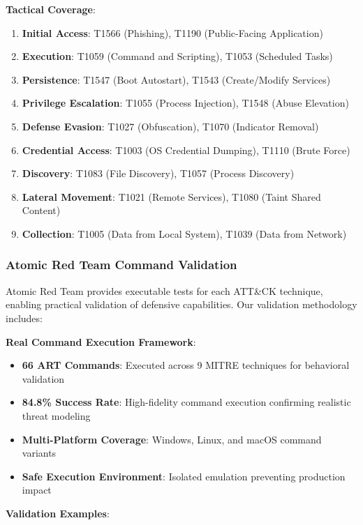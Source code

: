 \documentclass[12pt]{article}
\theoremstyle{definition}
\theoremstyle{plain}
\begin{document}
\textbf{Tactical Coverage}:
\begin{enumerate}
    \item \textbf{Initial Access}: T1566 (Phishing), T1190 (Public-Facing Application)
    \item \textbf{Execution}: T1059 (Command and Scripting), T1053 (Scheduled Tasks)
    \item \textbf{Persistence}: T1547 (Boot Autostart), T1543 (Create/Modify Services)
    \item \textbf{Privilege Escalation}: T1055 (Process Injection), T1548 (Abuse Elevation)
    \item \textbf{Defense Evasion}: T1027 (Obfuscation), T1070 (Indicator Removal)
    \item \textbf{Credential Access}: T1003 (OS Credential Dumping), T1110 (Brute Force)
    \item \textbf{Discovery}: T1083 (File Discovery), T1057 (Process Discovery)
    \item \textbf{Lateral Movement}: T1021 (Remote Services), T1080 (Taint Shared Content)
    \item \textbf{Collection}: T1005 (Data from Local System), T1039 (Data from Network)
\end{enumerate}

\subsubsection{Atomic Red Team Command Validation}

Atomic Red Team provides executable tests for each ATT\&CK technique, enabling practical validation of defensive capabilities. Our validation methodology includes:

\textbf{Real Command Execution Framework}:
\begin{itemize}
    \item \textbf{66 ART Commands}: Executed across 9 MITRE techniques for behavioral validation
    \item \textbf{84.8\% Success Rate}: High-fidelity command execution confirming realistic threat modeling
    \item \textbf{Multi-Platform Coverage}: Windows, Linux, and macOS command variants
    \item \textbf{Safe Execution Environment}: Isolated emulation preventing production impact
\end{itemize}

\textbf{Validation Examples}:
\end{document}
